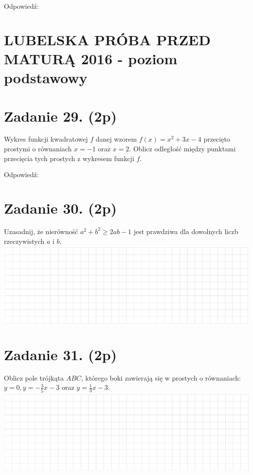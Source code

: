 \documentclass[10pt]{article}
\begin{document}
Odpowiedź:

\section*{LUBELSKA PRÓBA PRZED MATURĄ 2016 - poziom podstawowy}
\section*{Zadanie 29. (2p)}
Wykres funkcji kwadratowej \(f\) danej wzorem \(f(x)=x^{2}+3 x-4\) przecięto prostymi o równaniach \(x=-1\) oraz \(x=2\). Oblicz odległość między punktami przecięcia tych prostych z wykresem funkcji \(f\).

Odpowiedź:

\section*{Zadanie 30. (2p)}
Uzasadnij, że nierówność \(a^{2}+b^{2} \geq 2 a b-1\) jest prawdziwa dla dowolnych liczb rzeczywistych \(a\) i \(b\).\\
\includegraphics[max width=\textwidth, center]{2024_11_21_9d761ca624f0efee99a4g-09(1)}

\section*{Zadanie 31. (2p)}
Oblicz pole trójkąta \(A B C\), którego boki zawierają się w prostych o równaniach: \(y=0, y=-\frac{3}{5} x-3\) oraz \(y=\frac{1}{3} x-3\).\\
\includegraphics[max width=\textwidth, center]{2024_11_21_9d761ca624f0efee99a4g-09}
\end{document}
